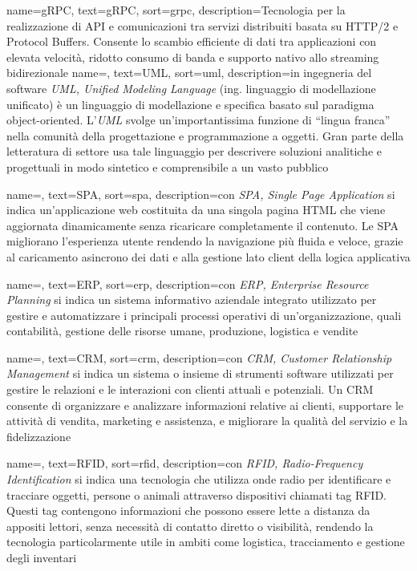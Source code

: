  {
    name=gRPC,
    text=gRPC,
    sort=grpc,
    description={Tecnologia per la realizzazione di API e comunicazioni tra servizi distribuiti basata su HTTP/2 e Protocol Buffers. Consente lo scambio efficiente di dati tra applicazioni con elevata velocità, ridotto consumo di banda e supporto nativo allo streaming bidirezionale}
}
 {
    name=,
    text=UML,
    sort=uml,
    description={in ingegneria del software \emph{UML, Unified Modeling Language} (ing. linguaggio di modellazione unificato) è un linguaggio di modellazione e specifica basato sul paradigma object-oriented. L'\emph{UML} svolge un'importantissima funzione di ``lingua franca'' nella comunità della progettazione e programmazione a oggetti. Gran parte della letteratura di settore usa tale linguaggio per descrivere soluzioni analitiche e progettuali in modo sintetico e comprensibile a un vasto pubblico}
}

 {
    name=,
    text=SPA,
    sort=spa,
    description={con \emph{SPA, Single Page Application} si indica un'applicazione web costituita da una singola pagina HTML che viene aggiornata dinamicamente senza ricaricare completamente il contenuto. Le SPA migliorano l’esperienza utente rendendo la navigazione più fluida e veloce, grazie al caricamento asincrono dei dati e alla gestione lato client della logica applicativa}
}

 {
    name=,
    text=ERP,
    sort=erp,
    description={con \emph{ERP, Enterprise Resource Planning} si indica un sistema informativo aziendale integrato utilizzato per gestire e automatizzare i principali processi operativi di un’organizzazione, quali contabilità, gestione delle risorse umane, produzione, logistica e vendite}
}

 {
    name=,
    text=CRM,
    sort=crm,
    description={con \emph{CRM, Customer Relationship Management} si indica un sistema o insieme di strumenti software utilizzati per gestire le relazioni e le interazioni con clienti attuali e potenziali. Un CRM consente di organizzare e analizzare informazioni relative ai clienti, supportare le attività di vendita, marketing e assistenza, e migliorare la qualità del servizio e la fidelizzazione}
}

 {
    name=,
    text=RFID,
    sort=rfid,
    description={con \emph{RFID, Radio-Frequency Identification} si indica una tecnologia che utilizza onde radio per identificare e tracciare oggetti, persone o animali attraverso dispositivi chiamati tag RFID. Questi tag contengono informazioni che possono essere lette a distanza da appositi lettori, senza necessità di contatto diretto o visibilità, rendendo la tecnologia particolarmente utile in ambiti come logistica, tracciamento e gestione degli inventari}
}

